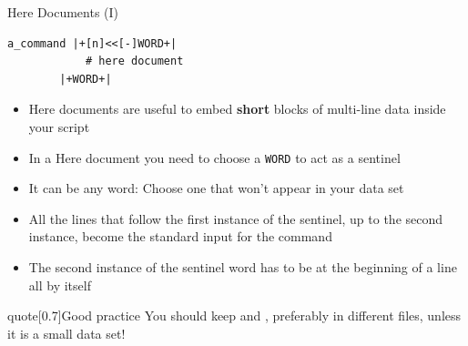 \begin{frame}[fragile]{Here Documents (I)}
    \begin{lstlisting}[style=MyBash, numbers=none]
        a_command |+[n]<<[-]WORD+|
            # here document
        |+WORD+|
    \end{lstlisting}
    \vspace{2mm}
    \begin{itemize}
        \item Here documents are useful to embed \textbf{short} blocks of multi-line data inside your script\\[-0.5ex]
        \item In a Here document you need to choose a \texttt{WORD} to act as a sentinel
        \item It can be any word: Choose one that won't appear in your data set
        \item All the lines that follow the first instance of the sentinel, up to the second instance, become the standard input for the command
        \item The second instance of the sentinel word has to be \alert{at the beginning of a line all by itself}
    \end{itemize}
    \begin{varblock}{quote}[0.7\textwidth]{Good practice}
        \textnormal{You should keep   and   , preferably in different files, unless it is a small data set!}
    \end{varblock}
\end{frame}
